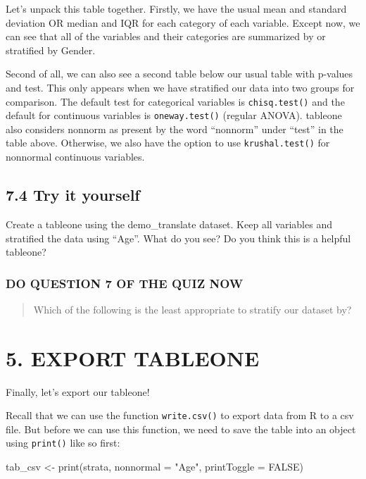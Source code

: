 \documentclass[
]{book}
\newenvironment{Shaded}{\begin{snugshade}}{\end{snugshade}}
\newcommand{\AttributeTok}[1]{\textcolor[rgb]{0.77,0.63,0.00}{#1}}
\newcommand{\ConstantTok}[1]{\textcolor[rgb]{0.00,0.00,0.00}{#1}}
\newcommand{\FunctionTok}[1]{\textcolor[rgb]{0.00,0.00,0.00}{#1}}
\newcommand{\NormalTok}[1]{#1}
\newcommand{\OtherTok}[1]{\textcolor[rgb]{0.56,0.35,0.01}{#1}}
\newcommand{\StringTok}[1]{\textcolor[rgb]{0.31,0.60,0.02}{#1}}
\begin{document}
Let's unpack this table together. Firstly, we have the usual mean and standard deviation OR median and IQR for each category of each variable. Except now, we can see that all of the variables and their categories are summarized by or stratified by Gender.

Second of all, we can also see a second table below our usual table with p-values and test. This only appears when we have stratified our data into two groups for comparison. The default test for categorical variables is \texttt{chisq.test()} and the default for continuous variables is \texttt{oneway.test()} (regular ANOVA). tableone also considers nonnorm as present by the word ``nonnorm'' under ``test'' in the table above. Otherwise, we also have the option to use \texttt{krushal.test()} for nonnormal continuous variables.

\hypertarget{try-it-yourself-37}{%
\subsection{7.4 Try it yourself}\label{try-it-yourself-37}}

Create a tableone using the demo\_translate dataset. Keep all variables and stratified the data using ``Age''. What do you see? Do you think this is a helpful tableone?

\hypertarget{do-question-7-of-the-quiz-now-2}{%
\subsubsection{DO QUESTION 7 OF THE QUIZ NOW}\label{do-question-7-of-the-quiz-now-2}}

\begin{quote}
Which of the following is the least appropriate to stratify our dataset by?
\end{quote}

\hypertarget{export-tableone}{%
\section{5. EXPORT TABLEONE}\label{export-tableone}}

Finally, let's export our tableone!

Recall that we can use the function \texttt{write.csv()} to export data from R to a csv file. But before we can use this function, we need to save the table into an object using \texttt{print()} like so first:

\begin{Shaded}
\begin{Highlighting}[]
\NormalTok{tab\_csv }\OtherTok{\textless{}{-}} \FunctionTok{print}\NormalTok{(strata,}
                 \AttributeTok{nonnormal =} \StringTok{"Age"}\NormalTok{,}
                 \AttributeTok{printToggle =} \ConstantTok{FALSE}\NormalTok{)}
\end{Highlighting}
\end{Shaded}
\end{document}

